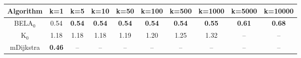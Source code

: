 \begin{tabular}{c|ccccccccc}\toprule
Algorithm & k=1 & k=5 & k=10 & k=50 & k=100 & k=500 & k=1000 & k=5000 & k=10000 \\ \midrule
BELA$_0$ & 0.54 & \textbf{0.54} & \textbf{0.54} & \textbf{0.54} & \textbf{0.54} & \textbf{0.54} & \textbf{0.55} & \textbf{0.61} & \textbf{0.68} \\
K$_0$ & 1.18 & 1.18 & 1.18 & 1.19 & 1.20 & 1.25 & 1.32 & -- & -- \\
mDijkstra & \textbf{0.46} & -- & -- & -- & -- & -- & -- & -- & -- \\ \bottomrule 
\end{tabular}
